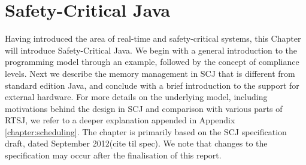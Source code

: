 \chapter{Safety-Critical Java}
\label{chapter:scj}
Having introduced the area of real-time and safety-critical systems, this Chapter will introduce Safety-Critical Java. We begin with a general introduction to the programming model through an example, followed by the concept of compliance levels. Next we describe the memory management in SCJ that is different from standard edition Java, and conclude with a brief introduction to the support for external hardware. For more details on the underlying model, including motivations behind the design in SCJ and comparison with various parts of RTSJ, we refer to a deeper explanation appended in Appendix \ref{chapter:scheduling}.
 The chapter is primarily based on the SCJ specification draft, dated September 2012(cite til spec). We note that changes to the specification may occur after the finalisation of this report.